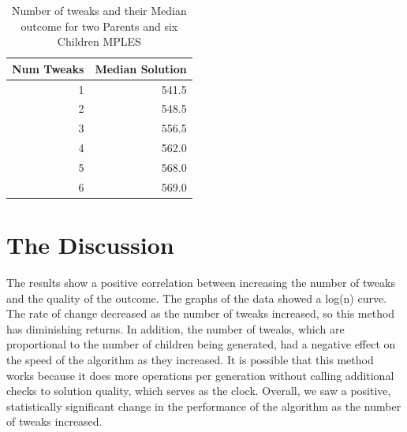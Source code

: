\documentclass[10pt]{article}
\begin{document}
\begin{table}[H]
\begin{center}
\begin{tabular}{r r}
Num Tweaks & Median Solution \\
\hline
1 & 541.5\\
2 & 548.5\\
3 & 556.5\\
4 & 562.0\\
5 & 568.0\\
6 & 569.0\\

\end{tabular}
\end{center}
\caption{Number of tweaks and their Median outcome for two Parents and six Children MPLES }
\label{tab:setup}
\end{table}





\section{The Discussion}
The results show a positive correlation between increasing the number of tweaks and the quality of the outcome. The graphs of the data showed a log(n) curve. The rate of change decreased as the number of tweaks increased, so this method has diminishing returns. In addition, the number of tweaks, which are proportional to the number of children being generated, had a negative effect on the speed of the algorithm as they increased. It is possible that this method works because it does more operations per generation without calling additional checks to solution quality, which serves as the clock. Overall, we saw a positive, statistically significant change in the performance of the algorithm as the number of tweaks increased.
\end{document}
